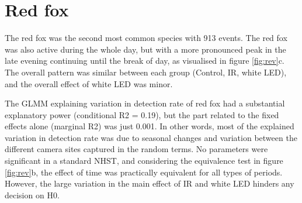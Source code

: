\begin{table}[ht]
\newpage
\section{Red fox}

The red fox was the second most common species with 913 events.
The red fox was also active during the whole day, but with a more pronounced peak in the late evening continuing until the break of day, as visualised in figure \ref{fig:rev}c.
The overall pattern was similar between each group (Control, IR, white LED), and the overall effect of white LED was minor.

The GLMM explaining variation in detection rate of red fox had a substantial explanatory power (conditional R2 = 0.19), but the part related to the fixed effects alone (marginal R2) was just 0.001.
In other words, most of the explained variation in detection rate was due to seasonal changes and variation between the different camera sites captured in the random terms.
No parameters were significant in a standard NHST, and considering the equivalence test in figure \ref{fig:rev}b, the effect of time was practically equivalent for all types of periods.
However, the large variation in the main effect of  IR and white LED hinders any decision on H0. %


\end{table}
